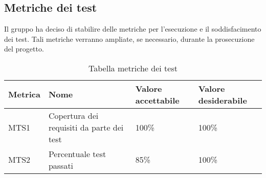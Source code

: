 \subsection{Metriche dei test}
Il gruppo ha deciso di stabilire delle metriche per l'esecuzione e il soddisfacimento dei test. Tali metriche verranno ampliate, se necessario, durante la prosecuzione del progetto.


{

\centering
\renewcommand{\arraystretch}{2}
\begin{longtable}{C{2cm} C{6.3cm} C{3cm} C{3cm}}
\caption{Tabella metriche dei test}\\
\textbf{Metrica} &
\textbf{Nome} &
\textbf{Valore accettabile}&
\textbf{Valore desiderabile}\\
\endhead


MTS1 & Copertura dei requisiti da parte dei test & 100\% & 100\%\\
MTS2 & Percentuale test passati & 85\% & 100\%\\


\end{longtable}
}
